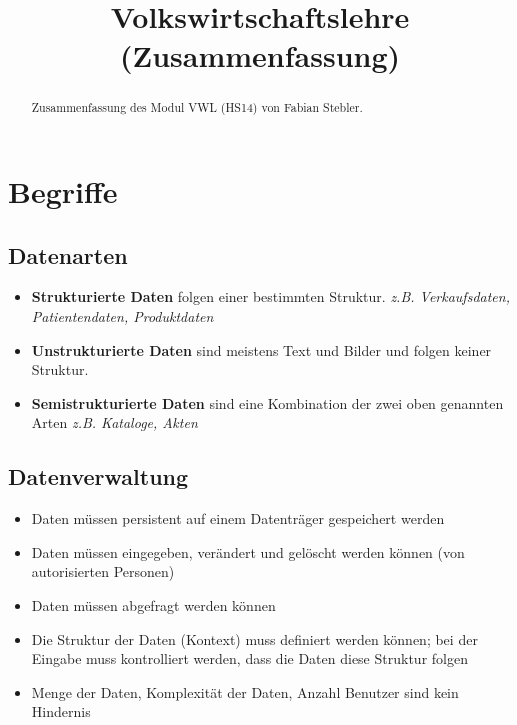 \documentclass[10pt]{scrartcl}
\title{ %
Volkswirtschaftslehre
\vspace{0.2cm}
\Large (Zusammenfassung)}
\begin{document}
 \maketitle
 \thispagestyle{firststyle}
 \pagestyle{firststyle}
 \begin{abstract}
 \begin{center}
  Zusammenfassung des Modul VWL (HS14) von Fabian Stebler. 
 \end{center}
 \vspace{0.5cm}
\hrulefill
\end{abstract}

 \pagestyle{documentstyle}
 \tableofcontents
 \pagebreak

\section{Begriffe}
\subsection{Datenarten}
\begin{itemize}
\item {\bf Strukturierte Daten } folgen einer bestimmten Struktur. {\it z.B. Verkaufsdaten, Patientendaten, Produktdaten}
\item {\bf Unstrukturierte Daten} sind meistens Text und Bilder und folgen keiner Struktur.
\item {\bf Semistrukturierte Daten} sind eine Kombination der zwei oben genannten Arten {\it z.B. Kataloge, Akten}
\end{itemize}
\subsection{Datenverwaltung}
\begin{itemize}
\item Daten müssen persistent auf einem Datenträger gespeichert werden
\item Daten müssen eingegeben, verändert und gelöscht werden können (von autorisierten Personen)
\item Daten müssen abgefragt werden können
\item Die Struktur der Daten (Kontext) muss definiert werden können; bei der Eingabe muss kontrolliert werden, dass die Daten diese Struktur folgen
\item Menge der Daten, Komplexität der Daten, Anzahl Benutzer sind kein Hindernis
\end{itemize}
\end{document}
